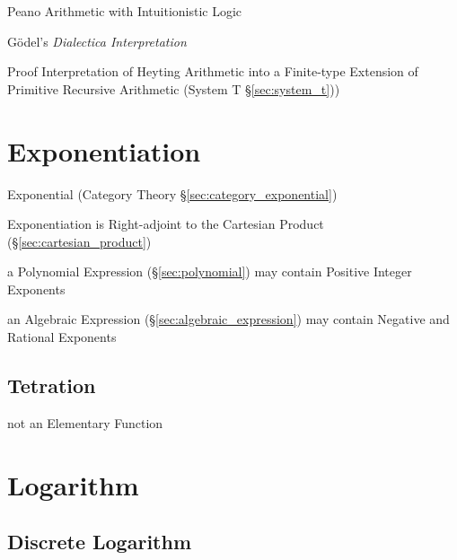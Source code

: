 Peano Arithmetic with Intuitionistic Logic

G\"odel's \emph{Dialectica Interpretation}

Proof Interpretation of Heyting Arithmetic into a Finite-type
Extension of Primitive Recursive Arithmetic
(System T \S\ref{sec:system_t}))



\section{Exponentiation}\label{sec:exponentiation}

\fist Exponential (Category Theory \S\ref{sec:category_exponential})

Exponentiation is Right-adjoint to the Cartesian Product
(\S\ref{sec:cartesian_product})

a Polynomial Expression (\S\ref{sec:polynomial}) may contain
Positive Integer Exponents

an Algebraic Expression (\S\ref{sec:algebraic_expression}) may contain Negative
and Rational Exponents



\subsection{Tetration}\label{sec:tetration}

not an Elementary Function



\section{Logarithm}\label{sec:logarithm}

\subsection{Discrete Logarithm}\label{sec:discrete_logarithm}

